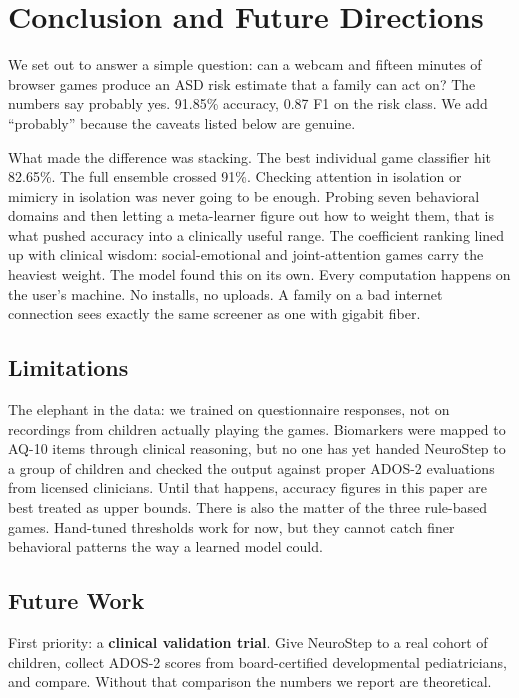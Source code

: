 \documentclass[conference]{IEEEtran}
\begin{document}
\section{Conclusion and Future Directions}

We set out to answer a simple question: can a webcam and fifteen minutes of browser games produce an ASD risk estimate that a family can act on? The numbers say probably yes. 91.85\% accuracy, 0.87 F1 on the risk class. We add ``probably'' because the caveats listed below are genuine.

What made the difference was stacking. The best individual game classifier hit 82.65\%. The full ensemble crossed 91\%. Checking attention in isolation or mimicry in isolation was never going to be enough. Probing seven behavioral domains and then letting a meta-learner figure out how to weight them, that is what pushed accuracy into a clinically useful range. The coefficient ranking lined up with clinical wisdom: social-emotional and joint-attention games carry the heaviest weight. The model found this on its own. Every computation happens on the user's machine. No installs, no uploads. A family on a bad internet connection sees exactly the same screener as one with gigabit fiber.

\subsection{Limitations}
The elephant in the data: we trained on questionnaire responses, not on recordings from children actually playing the games. Biomarkers were mapped to AQ-10 items through clinical reasoning, but no one has yet handed NeuroStep to a group of children and checked the output against proper ADOS-2 evaluations from licensed clinicians. Until that happens, accuracy figures in this paper are best treated as upper bounds. There is also the matter of the three rule-based games. Hand-tuned thresholds work for now, but they cannot catch finer behavioral patterns the way a learned model could.

\subsection{Future Work}
First priority: a \textbf{clinical validation trial}. Give NeuroStep to a real cohort of children, collect ADOS-2 scores from board-certified developmental pediatricians, and compare. Without that comparison the numbers we report are theoretical.
\end{document}
